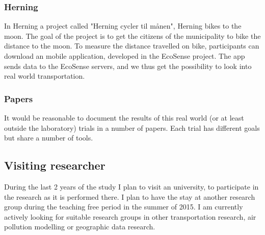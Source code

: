 \subsubsection{Herning}
In Herning a project called "Herning cycler til m\aa nen", Herning bikes to the moon. The goal of the project is to get the citizens of the municipality to bike the distance to the moon. To measure the distance travelled on bike, participants can download an mobile application, developed in the EcoSense project. The app sends data to the EcoSense servers, and we thus get the possibility to look into real world transportation.



\subsubsection{Papers}
It would be reasonable to document the results of this real world (or at least outside the laboratory) trials in a number of papers. Each trial has different goals but share a number of tools.
\subsection{Visiting researcher}
During the last 2 years of the study I plan to visit an university, to participate in the research as it is performed there. I plan to have the stay at another research group during the teaching free period in the summer of 2015. I am currently actively looking for suitable research groups in other transportation research, air pollution modelling or geographic data research.

